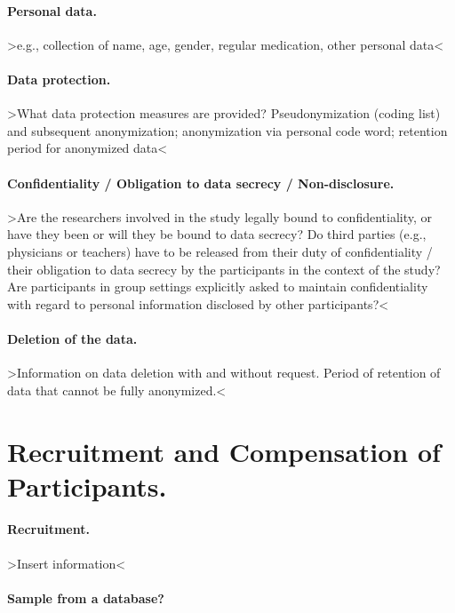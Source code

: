 \documentclass[11pt,twoside,a4paper]{article}
\begin{document}
\paragraph{Personal data.}

>e.g., collection of name, age, gender, regular medication, other personal data<


\paragraph{Data protection.}

>What data protection measures are provided? Pseudonymization (coding list) and subsequent anonymization; anonymization via personal code word; retention period for anonymized data<


\paragraph{Confidentiality / Obligation to data secrecy / Non-disclosure.}

>Are the researchers involved in the study legally bound to confidentiality, or have they been or will they be bound to data secrecy?
Do third parties (e.g., physicians or teachers) have to be released from their duty of confidentiality / their obligation to data secrecy by the participants in the context of the study?
Are participants in group settings explicitly asked to maintain confidentiality with regard to personal information disclosed by other participants?<

\paragraph{Deletion of the data.} 

>Information on data deletion with and without request. Period of retention of data that cannot be fully anonymized.<

\section{Recruitment and Compensation of Participants.}

\paragraph{Recruitment.}

>Insert information<

\paragraph{Sample from a database?}
\end{document}
